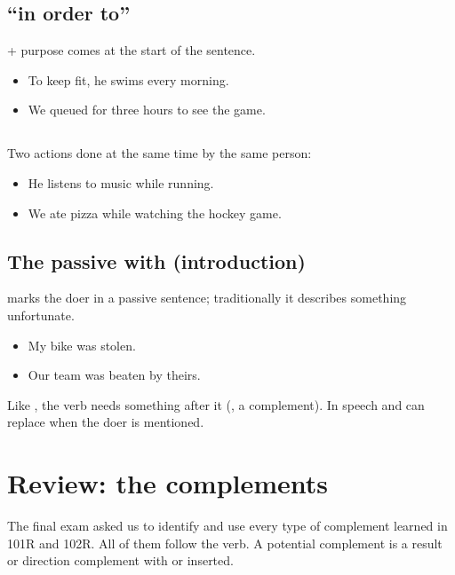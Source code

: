 \subsection{ ``in order to''}

 + purpose comes at the start of the sentence.
\begin{itemize}
  \item {} To keep fit, he swims every morning.
  \item {} We queued for three hours to see the
        game.
\end{itemize}

\subsection{}

Two actions done at the same time by the same person:
\begin{itemize}
  \item {} He listens to music while running.
  \item {} We ate pizza while watching the hockey game.
\end{itemize}

\subsection{The passive with  (introduction)}

 marks the doer in a passive sentence; traditionally it describes something
unfortunate.
\begin{itemize}
  \item {} My bike was stolen.
  \item {} Our team was beaten by theirs.
\end{itemize}
Like , the verb needs something after it (, a complement). In speech
 and  can replace  when the doer is mentioned.

\section{Review: the complements}

The final exam asked us to identify and use every type of complement learned in 101R
and 102R. All of them follow the verb. A potential complement is a result or direction
complement with  or  inserted.

